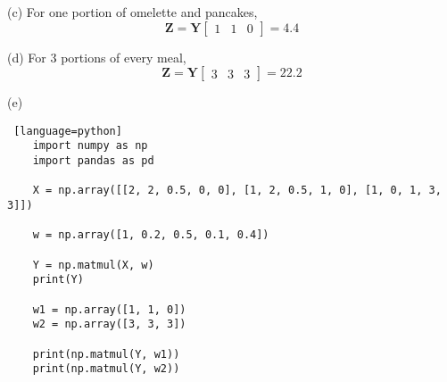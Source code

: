 \documentclass[a4paper, 12pt]{article}
\begin{document}
\begin{solution}
    (c) For one portion of omelette and pancakes,
    \[
        \mathbf{Z} = \mathbf{Y} \begin{bmatrix}
            1 & 1 & 0
        \end{bmatrix} = 4.4
    \]

    (d) For 3 portions of every meal,
    \[
        \mathbf{Z} = \mathbf{Y} \begin{bmatrix}
            3 & 3 & 3
        \end{bmatrix} = 22.2
    \]

    (e) \begin{lstlisting} [language=python]
    import numpy as np
    import pandas as pd
    
    X = np.array([[2, 2, 0.5, 0, 0], [1, 2, 0.5, 1, 0], [1, 0, 1, 3, 3]])
    
    w = np.array([1, 0.2, 0.5, 0.1, 0.4])
    
    Y = np.matmul(X, w)
    print(Y)
    
    w1 = np.array([1, 1, 0])
    w2 = np.array([3, 3, 3])
    
    print(np.matmul(Y, w1))
    print(np.matmul(Y, w2))  
    \end{lstlisting}
\end{solution}
\end{document}
